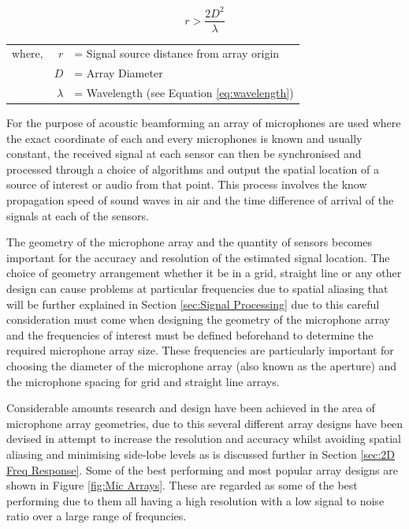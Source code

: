 \documentclass{UoNMCHA}
\numberwithin{equation}{section}
\begin{document}
    \begin{equation}
        r > \frac{2D^2}{\lambda}
        \label{eq:propogate}
    \end{equation}
    \begin{table}[H]
    \centering
        \begin{tabular}{lrl}
            where, & $r$ &= Signal source distance from array origin \\
             & $D$ &= Array Diameter \\
             & $\lambda$ &= Wavelength (see Equation \ref{eq:wavelength})
        \end{tabular}
    \end{table}
    
    For the purpose of acoustic beamforming an array of microphones are used where the exact coordinate of each and every microphones is known and usually constant, the received signal at each sensor can then be synchronised and processed through a choice of algorithms and output the spatial location of a source of interest or audio from that point. This process involves the know propagation speed of sound waves in air and the time difference of arrival of the signals at each of the sensors.
    
    The geometry of the microphone array and the quantity of sensors becomes important for the accuracy and resolution of the estimated signal location. The choice of geometry arrangement whether it be in a grid, straight line or any other design can cause problems at particular frequencies due to spatial aliasing that will be further explained in Section \ref{sec:Signal Processing} due to this careful consideration must come when designing the geometry of the microphone array and the frequencies of interest must be defined beforehand to determine the required microphone array size. These frequencies are particularly important for choosing the diameter of the microphone array (also known as the aperture) and the microphone spacing for grid and straight line arrays.
    
    Considerable amounts research and design have been achieved in the area of microphone array geometries, due to this several different array designs have been devised in attempt to increase the resolution and accuracy whilst avoiding spatial aliasing and minimising side-lobe levels as is discussed further in Section \ref{sec:2D Freq Response}. Some of the best performing and most popular array designs are shown in Figure \ref{fig:Mic Arrays}. These are regarded as some of the best performing due to them all having a high resolution with a low signal to noise ratio over a large range of frequncies.
    
\end{document}
